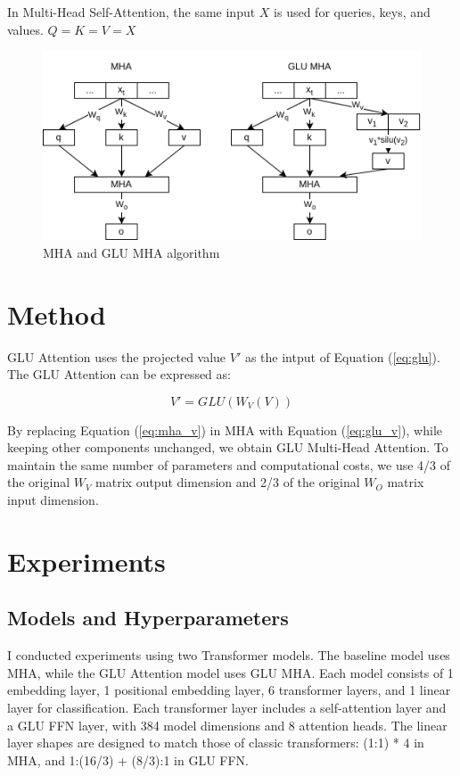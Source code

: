 \documentclass[11pt]{article}
\begin{document}
In Multi-Head Self-Attention, the same input $X$ is used for queries, keys, and values. $Q = K = V = X$

\begin{figure}[htbp]
    \centering
    \includegraphics[width=\textwidth]{GLU_Attention.png}
    \caption{MHA and GLU MHA algorithm}
\end{figure}

\section{Method}
GLU Attention uses the projected value $V'$ as the intput of Equation (\ref{eq:glu}). The GLU Attention can be expressed as:

\begin{equation}
V' = GLU(W_V(V))
\label{eq:glu_v}
\end{equation}

By replacing Equation (\ref{eq:mha_v}) in MHA with Equation (\ref{eq:glu_v}), while keeping other components unchanged, we obtain GLU Multi-Head Attention. To maintain the same number of parameters and computational costs, we use 4/3 of the original $W_V$ matrix output dimension and 2/3 of the original $W_O$ matrix input dimension.

\section{Experiments}

\subsection{Models and Hyperparameters}

I conducted experiments using two Transformer models. The baseline model uses MHA, while the GLU Attention model uses GLU MHA. Each model consists of 1 embedding layer, 1 positional embedding layer, 6 transformer layers, and 1 linear layer for classification. Each transformer layer includes a self-attention layer and a GLU FFN layer, with 384 model dimensions and 8 attention heads. The linear layer shapes are designed to match those of classic transformers: (1:1) * 4 in MHA, and 1:(16/3) + (8/3):1 in GLU FFN.
\end{document}
